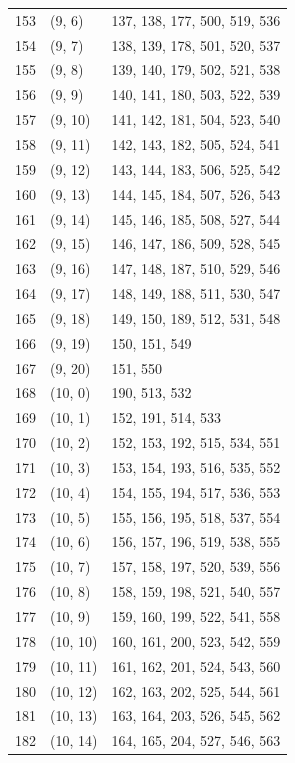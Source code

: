 \documentclass{article}
\begin{document}
\begin{longtable}{lll}
  153 & (9, 6) & 137, 138, 177, 500, 519, 536 \\
  154 & (9, 7) & 138, 139, 178, 501, 520, 537 \\
  155 & (9, 8) & 139, 140, 179, 502, 521, 538 \\
  156 & (9, 9) & 140, 141, 180, 503, 522, 539 \\
  157 & (9, 10) & 141, 142, 181, 504, 523, 540 \\
  158 & (9, 11) & 142, 143, 182, 505, 524, 541 \\
  159 & (9, 12) & 143, 144, 183, 506, 525, 542 \\
  160 & (9, 13) & 144, 145, 184, 507, 526, 543 \\
  161 & (9, 14) & 145, 146, 185, 508, 527, 544 \\
  162 & (9, 15) & 146, 147, 186, 509, 528, 545 \\
  163 & (9, 16) & 147, 148, 187, 510, 529, 546 \\
  164 & (9, 17) & 148, 149, 188, 511, 530, 547 \\
  165 & (9, 18) & 149, 150, 189, 512, 531, 548 \\
  166 & (9, 19) & 150, 151, 549 \\
  167 & (9, 20) & 151, 550 \\
  168 & (10, 0) & 190, 513, 532 \\
  169 & (10, 1) & 152, 191, 514, 533 \\
  170 & (10, 2) & 152, 153, 192, 515, 534, 551 \\
  171 & (10, 3) & 153, 154, 193, 516, 535, 552 \\
  172 & (10, 4) & 154, 155, 194, 517, 536, 553 \\
  173 & (10, 5) & 155, 156, 195, 518, 537, 554 \\
  174 & (10, 6) & 156, 157, 196, 519, 538, 555 \\
  175 & (10, 7) & 157, 158, 197, 520, 539, 556 \\
  176 & (10, 8) & 158, 159, 198, 521, 540, 557 \\
  177 & (10, 9) & 159, 160, 199, 522, 541, 558 \\
  178 & (10, 10) & 160, 161, 200, 523, 542, 559 \\
  179 & (10, 11) & 161, 162, 201, 524, 543, 560 \\
  180 & (10, 12) & 162, 163, 202, 525, 544, 561 \\
  181 & (10, 13) & 163, 164, 203, 526, 545, 562 \\
  182 & (10, 14) & 164, 165, 204, 527, 546, 563 \\

\end{longtable}
\end{document}
